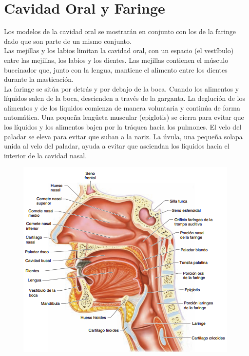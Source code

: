 \section{Cavidad Oral y Faringe}
Los modelos de la cavidad oral se mostrarán en conjunto con los de la faringe dado que son parte de un mismo conjunto.\\
Las mejillas y los labios limitan la cavidad oral, con un espacio (el vestíbulo) entre las mejillas, los labios y los dientes. Las mejillas contienen 
el músculo buccinador que, junto con la lengua, mantiene el alimento entre los dientes durante la masticación.\\
La faringe se sitúa por detrás y por debajo de la boca. Cuando los alimentos y líquidos salen de la boca, descienden a través de la garganta. 
La deglución de los alimentos y de los líquidos comienza de manera voluntaria y continúa de forma automática. Una pequeña lengüeta muscular (epiglotis) 
se cierra para evitar que los líquidos y los alimentos bajen por la tráquea hacia los pulmones. El velo del paladar se eleva para evitar que suban a la nariz. 
La úvula, una pequeña solapa unida al velo del paladar, ayuda a evitar que asciendan los líquidos hacia el interior de la cavidad nasal.\\
\begin{figure}[H]
	\begin{center}
 		\includegraphics[width = .7\textwidth]{v2/images/image84.png}
	\end{center} 
\end{figure}
